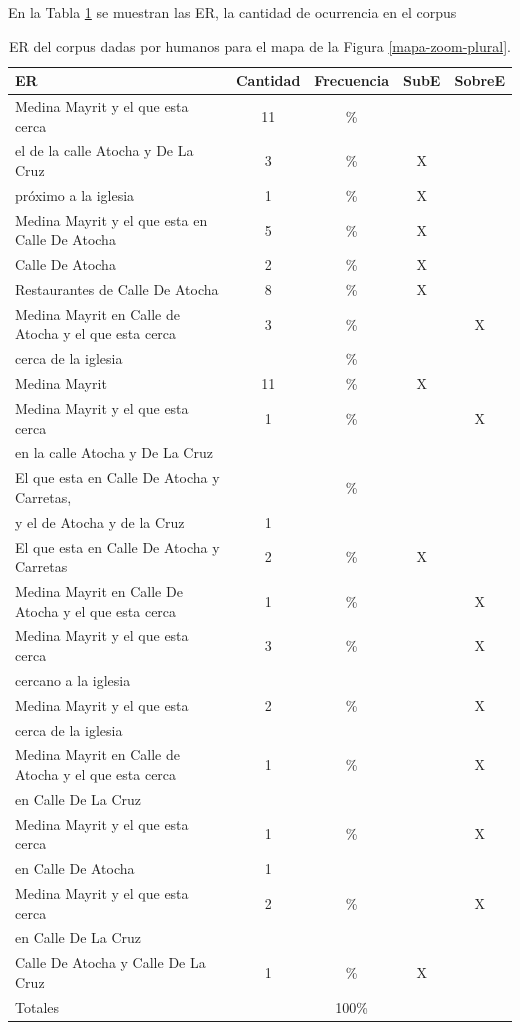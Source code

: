 En la Tabla \ref{freq-mapa-zoom-plural} se muestran las ER, la cantidad de ocurrencia en el corpus


\begin{table}[H]
{\footnotesize
\begin{center}
\begin{tabular}{|l|c|c|c|c|}
\hline
ER 					      & Cantidad &  Frecuencia & SubE & SobreE\\ \hline \hline
Medina Mayrit y el que esta cerca        &	11	&	\% &  &  \\ \hline
el de la calle Atocha y De La Cruz       &	3  &	\%	&X & \\  \hline
pr\'oximo a la iglesia 	      &1		&	\%	&X &\\ \hline
Medina Mayrit y el que esta en Calle De Atocha	      &5		&	\%	&X&\\ \hline
Calle De Atocha				&	2  &	\%	&X&\\ \hline
Restaurantes de Calle De Atocha				&	8  &	\%	&X&\\ \hline
Medina Mayrit en Calle de Atocha y el que esta cerca				& 3  &	\%	&&X\\
cerca de la iglesia				&	  &	\%	&&\\ \hline
Medina Mayrit			&11		&	\%	&X&\\  \hline
Medina Mayrit y el que esta cerca				&	1	&	\%  &&X\\
en la calle Atocha y De La Cruz        &	  &	&&\\ \hline
El que esta en Calle De Atocha y Carretas, 	      &		&	\%	&&\\
y el de Atocha y de la Cruz	      &1		&	&&\\ \hline
El que esta en Calle De Atocha y Carretas 					&	2  &	\%	&X&\\ \hline
Medina Mayrit en Calle De Atocha y el que esta cerca  				&  1 &	\%	&&X\\ \hline
Medina Mayrit y el que esta cerca				&		3 &	\%  & &X\\
cercano a la iglesia				&	  &	&&\\ \hline
Medina Mayrit y el que esta 	&	2	&	\%  &&X\\
cerca de la iglesia				&	  &	&&\\ \hline
Medina Mayrit en Calle de Atocha y el que esta cerca			&1  &	\%	&&X\\
en Calle De La Cruz	&	  &		&&\\ \hline
Medina Mayrit y el que esta cerca			&1  &	\%	&&X\\
en Calle De Atocha	&	1  &		&&\\ \hline
Medina Mayrit y el que esta cerca			&2  &	\%	&&X\\
en Calle De La Cruz	&	  &		&&\\ \hline
Calle De Atocha y Calle De La Cruz  					&1  &	\%	&X&\\
\hline \hline
Totales	&	&	100\%	&&\\

\hline
\end{tabular}
\caption{ER del corpus dadas por humanos para el mapa de la Figura \ref{mapa-zoom-plural}.}\label{freq-mapa-zoom-plural}
\end{center}
}
\end{table}
